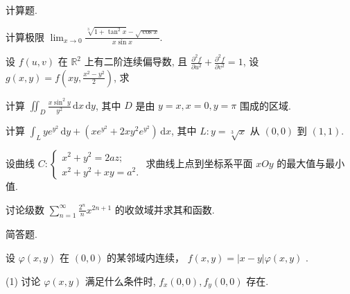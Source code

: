 \par{}
计算题.\par
计算极限 $\lim_{x\to 0}\frac{\sqrt[3]{1 + \tan^2x} - \sqrt{\cos x}}{x\sin x}$.\par
\par{}
设 $f(u, v)$ 在 $\mathbb{R}^2$ 上有二阶连续偏导数, 且 $\frac{\partial^2 f}{\partial u^2} + \frac{\partial^2 f}{\partial v^2} = 1$, 设 $g(x, y) = f\left(xy, \frac{x^2 - y^2}{2}\right)$, 求\par
\nopagebreak[4]
计算 $\iint_{D} \frac{x \sin^2 y}{y^2} \, \mathrm{d}x \, \mathrm{d}y$, 其中 $D$ 是由 $y = x, x = 0, y = \pi$ 围成的区域.\par
计算 $\int_{L} y e^{y^2} \, \mathrm{d}y + (x e^{y^2} + 2xy^2 e^{y^2}) \, \mathrm{d}x$, 其中 $L: y = \sqrt[3]{x}$ 从 $(0,0)$ 到 $(1,1)$.\par
设曲线 $C: \left\{ \begin{array}{l} x^2 + y^2 = 2az; \\ x^2 + y^2 + xy = a^2. \end{array} \right.$ 求曲线上点到坐标系平面 $xOy$ 的最大值与最小值.\par
讨论级数 $\sum_{n=1}^{\infty} \frac{2^n}{n} x^{2n+1}$ 的收敛域并求其和函数.\par
\par{}
简答题.\par
设  $\varphi(x,y)$  在  $(0,0)$  的某邻域内连续， $f(x,y)=|x-y|\varphi(x,y)$ .\par
(1) 讨论 $\varphi(x, y)$ 满足什么条件时, $f_x(0, 0), f_y(0, 0)$ 存在.\par
